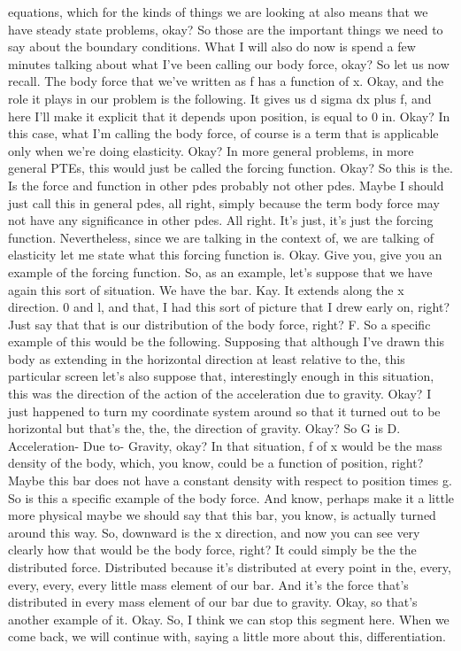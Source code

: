 \documentclass[10pt]{article}
\begin{document}
equations, which for the kinds of things we are looking at also means that we have steady state problems, okay? So those are the important things we need to say about the boundary conditions. What I will also do now is spend a few minutes talking about what I've been calling our body force, okay? So let us now recall. The body force that we've written as f has a function of x. Okay, and the role it plays in our problem is the following. It gives us d sigma dx plus f, and here I'll make it explicit that it depends upon position, is equal to 0 in. Okay? In this case, what I'm calling the body force, of course is a term that is applicable only when we're doing elasticity. Okay? In more general problems, in more general PTEs, this would just be called the forcing function. Okay? So this is the. Is the force and function in other pdes probably not other pdes. Maybe I should just call this in general pdes, all right, simply because the term body force may not have any significance in other pdes. All right. It's just, it's just the forcing function. Nevertheless, since we are talking in the context of, we are talking of elasticity let me state what this forcing function is. Okay. Give you, give you an example of the forcing function. So, as an example, let's suppose that we have again this sort of situation. We have the bar. Kay. It extends along the x direction. 0 and l, and that, I had this sort of picture that I drew early on, right? Just say that that is our distribution of the body force, right? F. So a specific example of this would be the following. Supposing that although I've drawn this body as extending in the horizontal direction at least relative to the, this particular screen let's also suppose that, interestingly enough in this situation, this was the direction of the action of the acceleration due to gravity. Okay? I just happened to turn my coordinate system around so that it turned out to be horizontal but that's the, the, the direction of gravity. Okay? So G is D. Acceleration- Due to- Gravity, okay? In that situation, f of x would be the mass density of the body, which, you know, could be a function of position, right? Maybe this bar does not have a constant density with respect to position times g. So is this a specific example of the body force. And know, perhaps make it a little more physical maybe we should say that this bar, you know, is actually turned around this way. So, downward is the x direction, and now you can see very clearly how that would be the body force, right? It could simply be the the distributed force. Distributed because it's distributed at every point in the, every, every, every, every little mass element of our bar. And it's the force that's distributed in every mass element of our bar due to gravity. Okay, so that's another example of it. Okay. So, I think we can stop this segment here. When we come back, we will continue with, saying a little more about this, differentiation.
\end{document}
